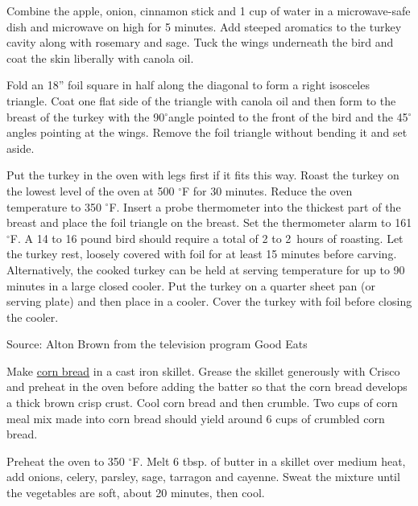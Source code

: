 \documentclass[letterpaper]{recipePMG}
\renewcommand{\deg}{$^\circ$}
\newcommand{\half}{\nicefrac{1}{2} \,}
\begin{document}
Combine the apple, onion, cinnamon stick and 1 cup of water in a microwave-safe dish and microwave on high for 5 minutes. Add steeped aromatics to the turkey cavity along with rosemary and sage. Tuck the wings underneath the bird and coat the skin liberally with canola oil.  

Fold an 18'' foil square in half along the diagonal to form a right isosceles triangle. Coat one flat side of the triangle with canola oil and then form to the breast of the turkey with the 90\deg angle pointed to the front of the bird and the 45\deg angles pointing at the wings.  Remove the foil triangle without bending it and set aside.


Put the turkey in the oven with legs first if it fits this way. Roast the turkey on the lowest level of the oven at 500 \deg F for 30 minutes. Reduce the oven temperature to 350 \deg F. Insert a probe thermometer into the thickest part of the breast and place the foil triangle on the breast.  Set the thermometer alarm to 161 \deg F. A 14 to 16 pound bird should require a total of 2 to 2\half hours of roasting. Let the turkey rest, loosely covered with foil for at least 15 minutes before carving. Alternatively, the cooked turkey can be held at serving temperature for up to 90 minutes in a large closed cooler.  Put the turkey on a quarter sheet pan (or serving plate) and then place in a cooler. Cover the turkey with foil before closing the cooler.

Source: Alton Brown from the television program Good Eats

\newpage
{}
\label{OysterDressing}

Make \hyperref[cornbread]{corn bread} in a cast iron skillet.
Grease the skillet generously with Crisco and preheat in the oven before adding the
batter so that the corn bread develops a thick brown crisp crust. 
Cool corn bread and then crumble. Two cups of corn meal mix made into
corn bread should yield around 6 cups of crumbled corn bread.

Preheat the oven to 350 \deg F.  Melt 6 tbsp. of butter in a skillet over medium heat, 
add onions, celery, parsley, sage, tarragon and cayenne.  Sweat the mixture
until the vegetables are soft, about 20 minutes, then cool.
\end{document}
